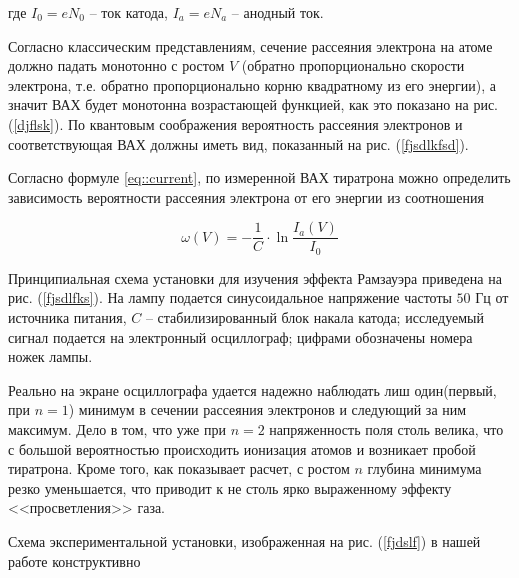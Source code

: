 где $I_0 = e N_0$ -- ток катода, $I_a = e N_a$ -- анодный ток.

Согласно классическим представлениям, сечение рассеяния электрона на атоме
должно падать монотонно с ростом $V$ (обратно пропорционально скорости
электрона, т.е. обратно пропорционально корню квадратному из его энергии), а
значит ВАХ будет монотонна возрастающей функцией, как это показано на рис.
(\ref{djflsk}). По квантовым соображения вероятность рассеяния электронов и
соответствующая ВАХ должны иметь вид, показанный на рис. (\ref{fjsdlkfsd}).

Согласно формуле \eqref{eq::current}, по измеренной ВАХ тиратрона можно
определить зависимость вероятности рассеяния электрона от его энергии из
соотношения

\begin{equation}
  \omega(V) = -\frac{1}{C} \cdot \ln \frac{I_a(V)}{I_0}
\end{equation}

Принципиальная схема установки для изучения эффекта Рамзауэра приведена на рис.
(\ref{fjsdlfks}). На лампу подается синусоидальное напряжение частоты $50$ Гц от
источника питания, $C$ -- стабилизированный блок накала катода; исследуемый
сигнал подается на электронный осциллограф; цифрами обозначены номера ножек
лампы.

Реально на экране осциллографа удается надежно наблюдать лиш один(первый, при $n
= 1$) минимум в сечении рассеяния электронов и следующий за ним максимум. Дело в
том, что уже при $n = 2$ напряженность поля столь велика, что с большой
вероятностью происходить ионизация атомов и возникает пробой тиратрона. Кроме
того, как показывает расчет, с ростом $n$ глубина минимума резко уменьшается,
что приводит к не столь ярко выраженному эффекту <<просветления>> газа.

Схема экспериментальной установки, изображенная на рис. (\ref{fjdslf}) в нашей
работе конструктивно